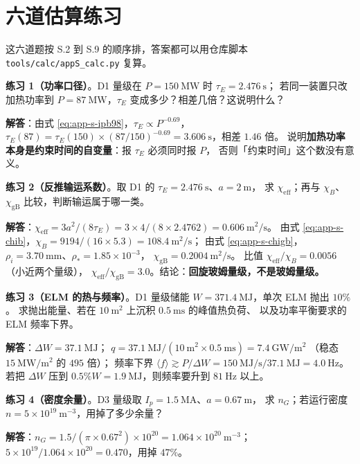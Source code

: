\section{六道估算练习}
\label{sec:app-s-problems}

这六道题按 S.2 到 S.9 的顺序排，答案都可以用仓库脚本 \texttt{tools/\allowbreak{}calc/\allowbreak{}appS\_calc.py} 复算。

\textbf{练习 1（功率口径）}。D1 量级在 $P=150\ \mathrm{MW}$ 时 $\tau_E=2.476\ \mathrm{s}$；
若同一装置只改加热功率到 $P=87\ \mathrm{MW}$，$\tau_E$ 变成多少？相差几倍？这说明什么？

\textbf{解答}：由式 \eqref{eq:app-s-ipb98}，$\tau_E\propto P^{-0.69}$，
$\tau_E(87)=\tau_E(150)\times(87/150)^{-0.69}=3.606\ \mathrm{s}$，相差 $1.46$ 倍。
说明\textbf{加热功率本身是约束时间的自变量}：报 $\tau_E$ 必须同时报 $P$，
否则「约束时间」这个数没有意义。

\textbf{练习 2（反推输运系数）}。取 D1 的 $\tau_E=2.476\ \mathrm{s}$、$a=2\ \mathrm{m}$，
求 $\chi_{\mathrm{eff}}$；再与 $\chi_B$、$\chi_{\mathrm{gB}}$ 比较，判断输运属于哪一类。

\textbf{解答}：$\chi_{\mathrm{eff}}=3a^2/(8\tau_E)=3\times4/(8\times2.4762)=0.606\ \mathrm{m^2/s}$。
由式 \eqref{eq:app-s-chib}，$\chi_B=9194/(16\times5.3)=108.4\ \mathrm{m^2/s}$；
由式 \eqref{eq:app-s-chigb}，$\rho_i=3.70\ \mathrm{mm}$、$\rho_\ast=1.85\times10^{-3}$，
$\chi_{\mathrm{gB}}=0.2004\ \mathrm{m^2/s}$。
比值 $\chi_{\mathrm{eff}}/\chi_B=0.0056$（小近两个量级），
$\chi_{\mathrm{eff}}/\chi_{\mathrm{gB}}=3.0$。结论：\textbf{回旋玻姆量级，不是玻姆量级。}

\textbf{练习 3（ELM 的热与频率）}。D1 量级储能 $W=371.4\ \mathrm{MJ}$，单次 ELM 抛出 $10\%$。
求抛出能量、若在 $10\ \mathrm{m^2}$ 上沉积 $0.5\ \mathrm{ms}$ 的峰值热负荷、
以及功率平衡要求的 ELM 频率下界。

\textbf{解答}：$\Delta W=37.1\ \mathrm{MJ}$；
$q=37.1\ \mathrm{MJ}/(10\ \mathrm{m^2}\times0.5\ \mathrm{ms})=7.4\ \mathrm{GW/m^2}$
（稳态 $15\ \mathrm{MW/m^2}$ 的 $495$ 倍）；
频率下界 $\langle f\rangle\gtrsim P/\Delta W=150\ \mathrm{MJ/s}/37.1\ \mathrm{MJ}=4.0\ \mathrm{Hz}$。
若把 $\Delta W$ 压到 $0.5\%W=1.9\ \mathrm{MJ}$，则频率要升到 $81\ \mathrm{Hz}$ 以上。

\textbf{练习 4（密度余量）}。D3 量级取 $I_p=1.5\ \mathrm{MA}$、$a=0.67\ \mathrm{m}$，
求 $n_G$；若运行密度 $n=5\times10^{19}\ \mathrm{m^{-3}}$，用掉了多少余量？

\textbf{解答}：$n_G=1.5/(\pi\times0.67^2)\times10^{20}=1.064\times10^{20}\ \mathrm{m^{-3}}$；
$5\times10^{19}/1.064\times10^{20}=0.470$，用掉 $47\%$。

